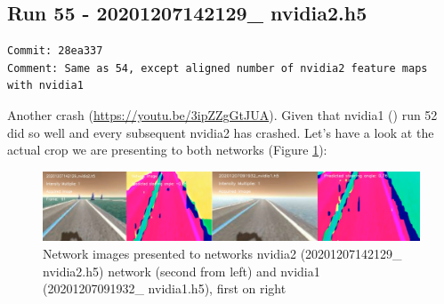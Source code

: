 \subsection{Run 55 - 20201207142129\_ nvidia2.h5}
\label{app_res:55}
\begin{verbatim}
Commit: 28ea337
Comment: Same as 54, except aligned number of nvidia2 feature maps with nvidia1
\end{verbatim}
Another crash (\url{https://youtu.be/3ipZZgGtJUA}). Given that nvidia1 () run 52 did so well and every subsequent nvidia2 has crashed. Let's have a look at the actual crop we are presenting to both networks (Figure \ref{fig:2129x1932crops}):
 
\begin{figure}[ht]
 \centering 
 \includegraphics[width=\textwidth]{Figures/2129x1932crops.png}
 \caption{Network images presented to networks nvidia2 (20201207142129\_ nvidia2.h5) network (second from left) and nvidia1 (20201207091932\_ nvidia1.h5), first on right}
 \label{fig:2129x1932crops}
\end{figure}

